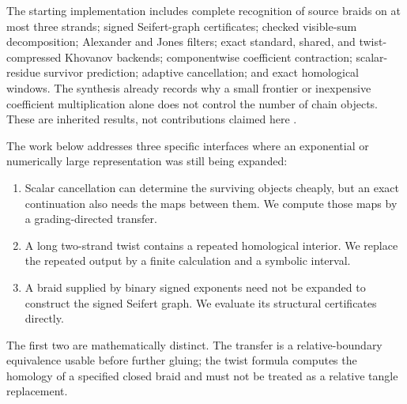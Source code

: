\documentclass[11pt]{article}
\theoremstyle{definition}
\theoremstyle{remark}
\begin{document}
The starting implementation includes complete recognition of source braids on at most three strands; signed Seifert-graph certificates; checked visible-sum decomposition; Alexander and Jones filters; exact standard, shared, and twist-compressed Khovanov backends; componentwise coefficient contraction; scalar-residue survivor prediction; adaptive cancellation; and exact homological windows. The synthesis already records why a small frontier or inexpensive coefficient multiplication alone does not control the number of chain objects. These are inherited results, not contributions claimed here \cite{proveit}.

The work below addresses three specific interfaces where an exponential or numerically large representation was still being expanded:
\begin{enumerate}
\item Scalar cancellation can determine the surviving objects cheaply, but an exact continuation also needs the maps between them. We compute those maps by a grading-directed transfer.
\item A long two-strand twist contains a repeated homological interior. We replace the repeated output by a finite calculation and a symbolic interval.
\item A braid supplied by binary signed exponents need not be expanded to construct the signed Seifert graph. We evaluate its structural certificates directly.
\end{enumerate}
The first two are mathematically distinct. The transfer is a relative-boundary equivalence usable before further gluing; the twist formula computes the homology of a specified closed braid and must not be treated as a relative tangle replacement.
\end{document}
